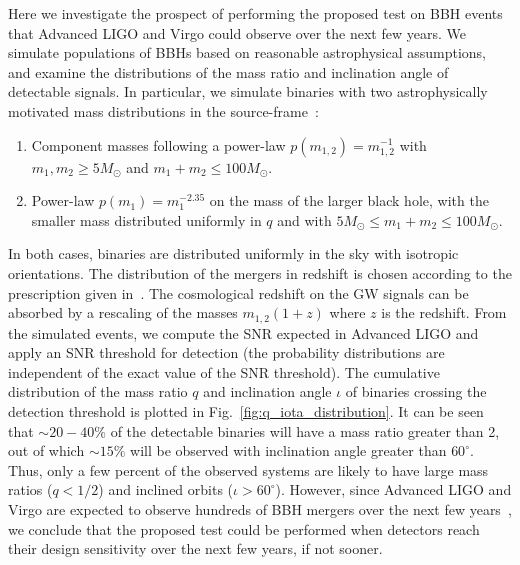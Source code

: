 \documentclass[prl,preprintnumbers,twocolumn,eqsecnum,floatfix,a4paper,nofootinbib,superscriptaddress]{revtex4}
\begin{document}
Here we investigate the  prospect of performing the proposed test on BBH events that Advanced LIGO and Virgo could observe over the next few years.  We simulate populations of BBHs based on reasonable astrophysical assumptions, and examine the distributions of the mass ratio and inclination angle of detectable signals. In particular, we simulate binaries with two astrophysically motivated mass distributions in the source-frame~\cite{Abbott:2016nhf}:
\begin{enumerate}
\item Component masses following a power-law $p(m_{1,2}) = m_{1,2}^{-1}$   with $m_1, m_2 \geq 5 M_\odot$ and $m_1 + m_2  \leq 100 M_\odot$. 
\item Power-law $p(m_1) = m_1^{-2.35}$ on the mass of the larger black hole, with the smaller mass distributed uniformly in $q$ and with $5 M_\odot \leq m_1 + m_2  \leq 100 M_\odot$. 
\end{enumerate}
In both cases, binaries are distributed uniformly in the sky with isotropic orientations. The distribution of the mergers in redshift is chosen according to the prescription given in~\cite{Dominik:2013tma}. The cosmological redshift on the GW signals can be absorbed by a rescaling of the masses $m_{1,2} (1+z)$ where $z$ is the redshift. From the simulated events, we compute the SNR expected  in Advanced LIGO and apply an SNR threshold for detection (the probability distributions are independent of the exact value of the SNR threshold). The cumulative distribution of the mass ratio $q$ and inclination angle $\iota$ of binaries crossing the detection threshold is plotted in Fig.~\ref{fig:q_iota_distribution}. It can be seen that $\sim 20 - 40\%$ of the detectable binaries will have a mass ratio greater than 2, out of which  $\sim 15\%$ will  be observed with inclination angle greater than $60^\circ$. Thus, only a few percent of the observed systems are likely to have large mass ratios ($q < 1/2$) and inclined orbits ($\iota > 60^\circ$). However, since Advanced LIGO and Virgo are expected to observe hundreds of BBH mergers over the next few years~\cite{Abbott:2016nhf}, we conclude that the proposed test could be performed when detectors reach their design sensitivity over the next few years, if not sooner.
\end{document}
